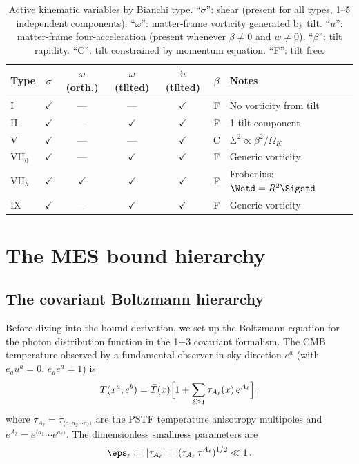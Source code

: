 \begin{table}[h]
\caption{Active kinematic variables by Bianchi type.
``$\sigma$'': shear (present for all types, 1--5 independent
components). ``$\omega$'': matter-frame vorticity generated by
tilt. ``$\dot{u}$'': matter-frame four-acceleration (present
whenever $\beta \neq 0$ and $w \neq 0$). ``$\beta$'': tilt
rapidity. ``C'': tilt constrained by momentum equation.
``F'': tilt free.}
\label{tab:kin-by-type}
\centering\footnotesize\setlength{\tabcolsep}{4pt}
\begin{tabular}{lcccccl}
\toprule
Type & $\sigma$ & $\omega$ (orth.) & $\omega$ (tilted)
  & $\dot{u}$ (tilted) & $\beta$ & Notes \\
\midrule
I      & $\checkmark$ & --- & ---
  & $\checkmark$ & F & No vorticity from tilt \\
II     & $\checkmark$ & --- & $\checkmark$
  & $\checkmark$ & F & 1 tilt component \\
V      & $\checkmark$ & --- & ---
  & $\checkmark$ & C & $\Sigma^2 \propto \beta^2/\Omega_K$ \\
VII$_0$& $\checkmark$ & --- & $\checkmark$
  & $\checkmark$ & F & Generic vorticity \\
VII$_h$& $\checkmark$ & $\checkmark$ & $\checkmark$
  & $\checkmark$ & F & Frobenius: $\Wstd = R^2\Sigstd$ \\
IX     & $\checkmark$ & --- & $\checkmark$
  & $\checkmark$ & F & Generic vorticity \\
\bottomrule
\end{tabular}
\end{table}


\section{The MES bound hierarchy}\label{sec:MES}

\subsection{The covariant Boltzmann hierarchy}
\label{sec:boltzmann}

Before diving into the bound derivation, we set up the
Boltzmann equation for the photon distribution function in the
1+3 covariant formalism.  The CMB temperature observed by a
fundamental observer in sky direction $e^a$ (with
$e_a u^a = 0$, $e_a e^a = 1$) is
\begin{equation}\label{eq:T-expansion}
T(x^a, e^b) = \bar{T}(x)\Bigl[
  1 + \sum_{\ell \geq 1}
    \tau_{A_\ell}(x)\,e^{A_\ell}
\Bigr]\,,
\end{equation}
where $\tau_{A_\ell} = \tau_{\langle a_1 a_2 \cdots a_\ell
\rangle}$ are the PSTF temperature anisotropy multipoles and
$e^{A_\ell} = e^{\langle a_1}\cdots e^{a_\ell\rangle}$.  The
dimensionless smallness parameters are
\begin{equation}\label{eq:eps-def}
\eps_\ell := |\tau_{A_\ell}|
= (\tau_{A_\ell}\,\tau^{A_\ell})^{1/2} \ll 1\,.
\end{equation}

